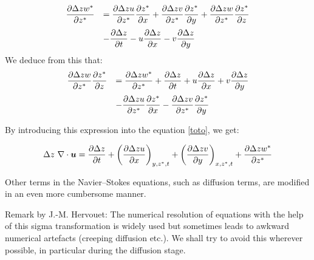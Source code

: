 \begin{equation}
\begin{array}{ll}
\dfrac{\partial \Delta zw^{\ast}}{\partial z^{\ast}}&=
\dfrac{\partial \Delta zu}{\partial z^{\ast}}
\dfrac{\partial z^{\ast}}{\partial x}+\dfrac{\partial\Delta
zv}{\partial z^{\ast}}\dfrac{\partial z^{\ast}}{\partial
y}+\dfrac{\partial \Delta zw}{\partial z^{\ast}}
\dfrac{\partial z^{\ast}}{\partial z}\medskip \\
&-\dfrac{\partial \Delta z}{\partial t}-u\dfrac{\partial \Delta z}{\partial
x}-v\dfrac{\partial \Delta z}{\partial y}%
\end{array}
\end{equation}
We deduce from this that:
\begin{equation}
\begin{array}{ll}
\dfrac{\partial \Delta zw}{\partial z^{\ast}}
\dfrac{\partial z^{\ast}}{\partial z}&=\dfrac{\partial \Delta zw^{\ast}%
}{\partial z^{\ast}}+\dfrac{\partial \Delta z}{\partial
t}+u\dfrac{\partial \Delta z}{\partial x}+v\dfrac{\partial \Delta z}{\partial y}\medskip \\
&-\dfrac{\partial \Delta zu}{\partial z^{\ast}}
\dfrac{\partial z^{\ast}}{\partial x}-\dfrac{\partial \Delta zv}{\partial
z^{\ast}}\dfrac{\partial z^{\ast}}{\partial y}%
\end{array}
\end{equation}


By introducing this expression into the equation \eqref{toto}, we get:

\begin{equation}
\Delta z~\nabla \cdot\bm{u}=\dfrac{\partial \Delta z}{\partial t}+\left(
\dfrac{\partial \Delta zu}{\partial x}\right)  _{y,z^{\ast},t}+\left(
\dfrac{\partial \Delta zv}{\partial y}\right)  _{x,z^{\ast},t}+
\dfrac{\partial \Delta zw^{\ast}}{\partial z^{\ast}}
\label{divutransf}
\end{equation}

Other terms in the Navier--Stokes equations, such as diffusion terms, are
modified in an even more cumbersome manner.

\begin{CommentBlock}{Remark by J.-M. Hervouet:}
The numerical resolution of equations with the help of this sigma transformation is widely used but sometimes
leads to awkward numerical artefacts (creeping diffusion etc.). We shall try
to avoid this wherever possible, in particular during the diffusion stage.
\end{CommentBlock}


